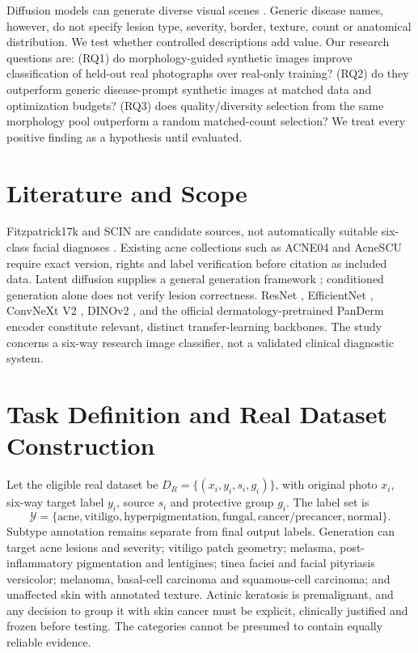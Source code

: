 \documentclass[11pt,a4paper]{article}
\begin{document}
Diffusion models can generate diverse visual scenes \cite{rombach2022}. Generic disease names, however, do not specify lesion type, severity, border, texture, count or anatomical distribution. We test whether controlled descriptions add value. Our research questions are: (RQ1) do morphology-guided synthetic images improve classification of held-out real photographs over real-only training? (RQ2) do they outperform generic disease-prompt synthetic images at matched data and optimization budgets? (RQ3) does quality/diversity selection from the same morphology pool outperform a random matched-count selection? We treat every positive finding as a hypothesis until evaluated.

\section{Literature and Scope}
Fitzpatrick17k and SCIN are candidate sources, not automatically suitable six-class facial diagnoses \cite{groh2021,scin}. Existing acne collections such as ACNE04 and AcneSCU require exact version, rights and label verification before citation as included data. Latent diffusion supplies a general generation framework \cite{rombach2022}; conditioned generation alone does not verify lesion correctness. ResNet \cite{he2016}, EfficientNet \cite{tan2019}, ConvNeXt V2 \cite{woo2023}, DINOv2 \cite{oquab2024}, and the official dermatology-pretrained PanDerm encoder \cite{yan2025} constitute relevant, distinct transfer-learning backbones. The study concerns a six-way research image classifier, not a validated clinical diagnostic system.

\section{Task Definition and Real Dataset Construction}
Let the eligible real dataset be $D_R=\{(x_i,y_i,s_i,g_i)\}$, with original photo $x_i$, six-way target label $y_i$, source $s_i$ and protective group $g_i$. The label set is
\[
\mathcal{Y}=\{\text{acne},\text{vitiligo},\text{hyperpigmentation},\text{fungal},\text{cancer/precancer},\text{normal}\}.
\]
Subtype annotation remains separate from final output labels. Generation can target acne lesions and severity; vitiligo patch geometry; melasma, post-inflammatory pigmentation and lentigines; tinea faciei and facial pityriasis versicolor; melanoma, basal-cell carcinoma and squamous-cell carcinoma; and unaffected skin with annotated texture. Actinic keratosis is premalignant, and any decision to group it with skin cancer must be explicit, clinically justified and frozen before testing. The categories cannot be presumed to contain equally reliable evidence.
\end{document}
